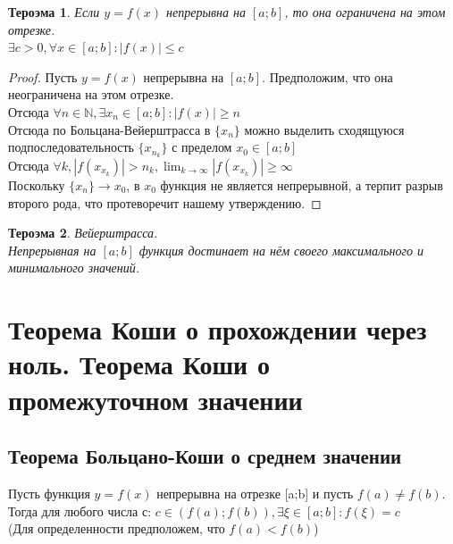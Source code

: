 \documentclass[oneside]{book}
\newtheorem{thm}{Тероэма}[chapter] %
\begin{document}
\begin{thm}
Если $y = f(x)$ непрерывна на $[a; b]$, то она ограничена на этом отрезке. \\
$ \exists c > 0, \forall x \in [a;b]: |f(x)| \leq c $
\end{thm}
\begin{proof}
    Пусть $y = f(x)$ непрерывна на $[a; b]$. Предположим, что она неограничена на этом отрезке. \\
    Отсюда $\forall n \in \mathbb{N}, \exists x_n \in [a;b]: |f(x)| \geq n$\\
    Отсюда по Больцана-Вейерштрасса в $\{x_n\}$ можно выделить сходящуюся подпоследовательность $\{x_{n_k}\}$ с пределом $x_0 \in [a; b]$\\
    Отсюда $\forall k, |f(x_{x_k})| > n_k, \lim_{k \rightarrow \infty}{|f(x_{x_k})|} \geq \infty$ \\
    Поскольку $\{x_n\} \rightarrow x_0$, в $x_0$ функция не является непрерывной, а терпит разрыв второго рода, что протеворечит нашему утверждению.
\end{proof}

\begin{thm}
    Вейерштрасса. \\
    Непрерывная на $[a; b]$ функция достинает на нём своего максимального и минимального значений.
\end{thm}


\setcounter{chapter}{15}
\chapter {Теорема Коши о прохождении через ноль. Теорема Коши о промежуточном значении}
\section{Теорема Больцано-Коши о среднем значении}
Пусть функция $y = f(x)$ непрерывна на отрезке [a;b] и пусть $f(a)\neq f(b)$. Тогда для любого числа с: $c \in (f(a); f(b)), \exists \xi \in [a; b]: f(\xi)=c$
\\(Для определенности предположем, что $f(a)<f(b)$)
\end{document}
